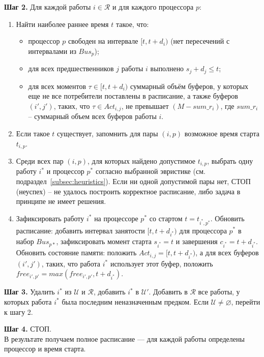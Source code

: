 \textbf{Шаг 2.} Для каждой работы $i \in \mathcal{R}$ и для каждого процессора $p$:
\begin{enumerate}
	\item Найти наиболее раннее время $t$ такое, что:
	\begin{itemize}
		\item процессор $p$ свободен на интервале $[t, t+d_i)$ (нет пересечений с интервалами из $Bus_p$);
		\item для всех предшественников $j$ работы $i$ выполнено $s_j + d_j \le t$;
		\item для всех моментов $\tau \in [t, t+d_i)$ суммарный объём буферов, у которых еще не все потребители поставлены в расписание, а также буферов $(i', j')$, таких, что $\tau \in Act_{i, j}$, не превышает $(M - sum\_r_i)$, где $sum\_r_i$ -- суммарный объем всех буферов работы $i$.
	\end{itemize}
	\item Если такое $t$ существует, запомнить для пары $(i,p)$ возможное время старта $t_{i,p}$.

	\item Среди всех пар $(i,p)$, для которых найдено допустимое $t_{i,p}$, выбрать одну работу $i^*$ и процессор $p^*$ согласно выбранной эвристике (см. подраздел~\ref{subsec:heuristics}). Если ни одной допустимой пары нет, СТОП (неуспех) -- не удалось построить корректное расписание, либо задача в принципе не имеет решения.

	\item Зафиксировать работу $i^*$ на процессоре $p^*$ со стартом $t = t_{i^*,p^*}$. Обновить расписание: добавить интервал занятости $[t, t+d_{i^*})$ для процессора $p^*$ в набор $Bus_{p*}$, зафиксировать момент старта $s_{i^*}=t$ и завершения $c_{i^*}=t+d_{i^*}$. Обновить состояние памяти: положить $Act_{i, j} = [t, t+d_{i^*})$, а для всех буферов $(i', j')$, таких, что работа $i^*$ использует этот буфер, положить $free_{i',p'} = max(free_{i',p'}, t+d_{i^*})$.
\end{enumerate}

\textbf{Шаг 3.} Удалить $i^*$ из $\mathcal{U}$ и $\mathcal{R}$, добавить $i^*$ в $\mathcal{U'}$. Добавить в $\mathcal{R}$ все работы, у которых работа $i^*$ была последним неназначенным предком. Если $\mathcal{U} \neq \varnothing$, перейти к шагу 2.

\textbf{Шаг 4.} СТОП.\\

В результате получаем полное расписание — для каждой работы определены процессор и время старта.

